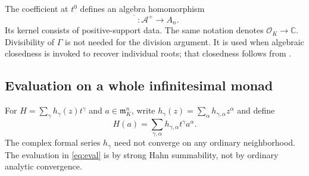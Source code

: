 \documentclass[11pt,letterpaper]{article}
\theoremstyle{definition}
\theoremstyle{remark}
\newcommand{\C}{\mathbb C}
\newcommand{\A}{\mathscr A}
\newcommand{\OO}{\mathcal O}
\newcommand{\mm}{\mathfrak m}
\newcommand{\red}[1]{\overline{#1}}
\numberwithin{equation}{section}
\begin{document}
The coefficient at $t^0$ defines an algebra homomorphism
\[
 \red{\phantom{H}}:\A^+\longrightarrow A_n.
\]
Its kernel consists of positive-support data. The same notation denotes $\OO_K\to\C$. Divisibility of $\Gamma$ is not needed for the division argument. It is used when algebraic closedness is invoked to recover individual roots; that closedness follows from \cite[Corollary 4]{Poonen}.

\subsection{Evaluation on a whole infinitesimal monad}
For $H=\sum_\gamma h_\gamma(z)t^\gamma$ and $a\in\mm_K^n$, write $h_\gamma(z)=\sum_\alpha h_{\gamma,\alpha}z^\alpha$ and define
\begin{equation}\label{eq:eval}
 H(a)=\sum_{\gamma,\alpha}h_{\gamma,\alpha}t^\gamma a^\alpha.
\end{equation}
The complex formal series $h_\gamma$ need not converge on any ordinary neighborhood. The evaluation in \eqref{eq:eval} is by strong Hahn summability, not by ordinary analytic convergence.
\end{document}
